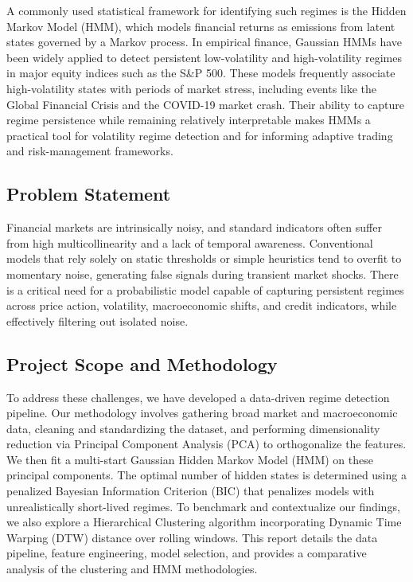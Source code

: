 \documentclass[a4paper,fleqn]{cas-sc}
\begin{document}
A commonly used statistical framework for identifying such regimes is the Hidden Markov Model (HMM), which models financial returns as emissions from latent states governed by a Markov process. In empirical finance, Gaussian HMMs have been widely applied to detect persistent low-volatility and high-volatility regimes in major equity indices such as the S\&P 500. These models frequently associate high-volatility states with periods of market stress, including events like the Global Financial Crisis and the COVID-19 market crash. Their ability to capture regime persistence while remaining relatively interpretable makes HMMs a practical tool for volatility regime detection and for informing adaptive trading and risk-management frameworks.

\subsection{Problem Statement}
Financial markets are intrinsically noisy, and standard indicators often suffer from high multicollinearity and a lack of temporal awareness. Conventional models that rely solely on static thresholds or simple heuristics tend to overfit to momentary noise, generating false signals during transient market shocks. There is a critical need for a probabilistic model capable of capturing persistent regimes across price action, volatility, macroeconomic shifts, and credit indicators, while effectively filtering out isolated noise.

\subsection{Project Scope and Methodology}
To address these challenges, we have developed a data-driven regime detection pipeline. Our methodology involves gathering broad market and macroeconomic data, cleaning and standardizing the dataset, and performing dimensionality reduction via Principal Component Analysis (PCA) to orthogonalize the features. We then fit a multi-start Gaussian Hidden Markov Model (HMM) on these principal components. The optimal number of hidden states is determined using a penalized Bayesian Information Criterion (BIC) that penalizes models with unrealistically short-lived regimes. To benchmark and contextualize our findings, we also explore a Hierarchical Clustering algorithm incorporating Dynamic Time Warping (DTW) distance over rolling windows. This report details the data pipeline, feature engineering, model selection, and provides a comparative analysis of the clustering and HMM methodologies.
\end{document}

